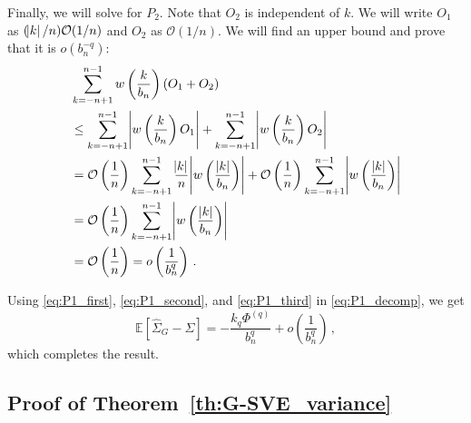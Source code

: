 \documentclass[11pt]{article}
\theoremstyle{remark}
\begin{document}
  Finally, we will solve for $P_2$. Note that $O_2$ is independent of $k$. We will write $O_1$ as $(\abs{k}/n)\mathcal{O}(1/n)$ and $O_2$ as $\mathcal{O}(1/n)$. We will find an upper bound and prove that it is $o\left(b_n^{-q}\right)$:
  \begin{align*}
      &  \sum_{k=-n+1}^{n-1}w\left(\dfrac{k}{b_n}\right)( O_1 + O_2) \\
      & \leq \sum_{k=-n+1}^{n-1}\abs{w\left(\dfrac{k}{b_n}\right)O_1} + \sum_{k=-n+1}^{n-1}\abs{w\left(\dfrac{k}{b_n}\right)O_2} \\
      &= \mathcal{O}\left(\dfrac{1}{n}\right)\sum_{k=-n+1}^{n-1}\dfrac{\abs{k}}{n}\abs{w\left(\dfrac{|k|}{b_n}\right)} + \mathcal{O}\left(\dfrac{1}{n}\right)\sum_{k=-n+1}^{n-1}\abs{w\left(\dfrac{|k|}{b_n}\right)}\\
      &= \mathcal{O}\left(\dfrac{1}{n}\right) \sum_{k=-n+1}^{n-1}\abs{w\left(\dfrac{|k|}{b_n}\right)}\\
      &= \mathcal{O}\left(\dfrac{1}{n}\right) = o\left(\dfrac{1}{b_n^q}\right) \,.
 \end{align*}
 
%
Using \eqref{eq:P1_first}, \eqref{eq:P1_second}, and \eqref{eq:P1_third} in \eqref{eq:P1_decomp}, we get
\[
\mathbb{E} \left[\hat{\Sigma}_{G} - \Sigma \right] = -\dfrac{k_q \Phi^{(q)} }{b_n^q} + o\left( \dfrac{1}{b_n^q} \right)\,,
\]
which completes the result.
%

\subsection{Proof of Theorem~\ref{th:G-SVE_variance}}
\label{appendix:variance}
 
\end{document}
